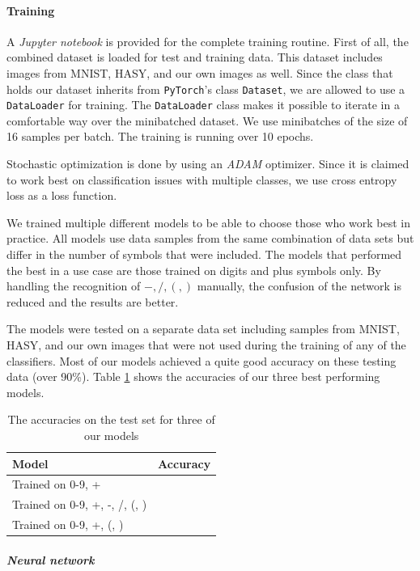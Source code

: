 \documentclass[11pt]{article}
\begin{document}
		
	\paragraph{Training}
		A \textit{Jupyter notebook} is provided for the complete training routine. First of all, the combined dataset is loaded for test and training data. This dataset includes images from MNIST, HASY, and our own images as well. Since the class that holds our dataset inherits from \texttt{PyTorch}'s class \texttt{Dataset}, we are allowed to use a \texttt{DataLoader} for training. The \texttt{DataLoader} class makes it possible to iterate in a comfortable way over the minibatched dataset. We use minibatches of the size of 16 samples per batch. The training is running over 10 epochs.
		
		Stochastic optimization is done by using an \textit{ADAM}\cite{adam} optimizer. Since it is claimed to work best on classification issues with multiple classes, we use cross entropy loss as a loss function.
		
		We trained multiple different models to be able to choose those who work best in practice. All models use data samples from the same combination of data sets but differ in the number of symbols that were included. The models that performed the best in a use case are those trained on digits and plus symbols only. By handling the recognition of $-, /, (, )$ manually, the confusion of the network is reduced and the results are better. 
		
		The models were tested on a separate data set including samples from MNIST, HASY, and our own images that were not used during the training of any of the classifiers. Most of our models achieved a quite good accuracy on these testing data (over 90\%). Table \ref{tab:accuracies} shows the accuracies of our three best performing models.
		\begin{table}[H]
			\begin{tabular}{l|l}
				\textbf{Model} & \textbf{Accuracy} \\
				\hline
				Trained on 0-9, + & \\
				\hline
				Trained on 0-9, +, -, /, (, ) & \\
				\hline
				Trained on 0-9, +, (, ) &
			\end{tabular}
			\caption{The accuracies on the test set for three of our models}
			\label{tab:accuracies}
		\end{table}
				
		\subparagraph{Neural network}
		
\end{document}
